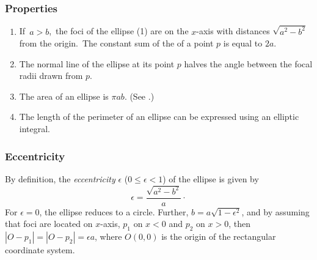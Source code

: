 \documentclass[12pt]{article}
\begin{document}
\subsubsection*{Properties}
\begin{enumerate}
\item If\, $a > b$,\, the foci of the ellipse (1) are on the $x$-axis with distances $\sqrt{a^2-b^2}$ from the origin.\, The constant sum of the  of a point $p$ is equal to $2a$.
\item The normal line of the ellipse at its point $p$ halves the angle between the focal radii drawn from $p$.
\item The area of an ellipse is $\pi a b$.  (See .)
\item The length of the perimeter of an ellipse can be expressed using an elliptic integral. 
\end{enumerate}

\subsubsection*{Eccentricity}
By definition, the {\em eccentricity} $\epsilon$ ($0\leq\epsilon<1$) of the ellipse is given by 
\begin{equation*}
\epsilon=\frac{\sqrt{a^2-b^2}}{a}\cdot
\end{equation*}
For $\epsilon=0$, the ellipse reduces to a circle. Further, $b=a\sqrt{1-\epsilon^2}$, and by assuming that foci are located on $x$-axis, $p_1$ on $x<0$ and $p_2$ on $x>0$, then $|O-p_1|=|O-p_2|=\epsilon a$, where $O(0,0)$ is the origin of the rectangular coordinate system.  
\end{document}
